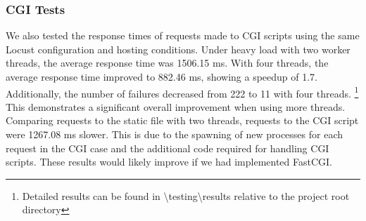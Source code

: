 \subsubsection*{CGI Tests}
We also tested the response times of requests made to CGI scripts using the same Locust configuration and hosting conditions. Under heavy load with two worker threads, the average response time was 1506.15 ms. With four threads, the average response time improved to 882.46 ms, showing a speedup of 1.7. Additionally, the number of failures decreased from 222 to 11 with four threads. \footnote{Detailed results can be found in \textbackslash testing\textbackslash results relative to the project root directory}
This demonstrates a significant overall improvement when using more threads. Comparing requests to the static file with two threads, requests to the CGI script were 1267.08 ms slower. This is due to the spawning of new processes for each request in the CGI case and the additional code required for handling CGI scripts. These results would likely improve if we had implemented FastCGI.

